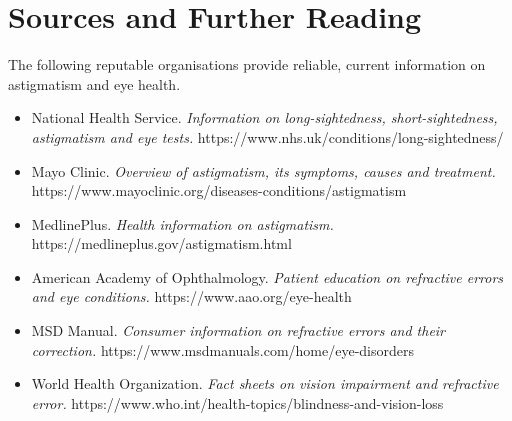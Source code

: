 \section*{Sources and Further Reading}
The following reputable organisations provide reliable, current information on astigmatism and eye health.

\begin{itemize}
    \item National Health Service. \textit{Information on long-sightedness, short-sightedness, astigmatism and eye tests.} https://www.nhs.uk/conditions/long-sightedness/
    \item Mayo Clinic. \textit{Overview of astigmatism, its symptoms, causes and treatment.} https://www.mayoclinic.org/diseases-conditions/astigmatism
    \item MedlinePlus. \textit{Health information on astigmatism.} https://medlineplus.gov/astigmatism.html
    \item American Academy of Ophthalmology. \textit{Patient education on refractive errors and eye conditions.} https://www.aao.org/eye-health
    \item MSD Manual. \textit{Consumer information on refractive errors and their correction.} https://www.msdmanuals.com/home/eye-disorders
    \item World Health Organization. \textit{Fact sheets on vision impairment and refractive error.} https://www.who.int/health-topics/blindness-and-vision-loss
\end{itemize}
